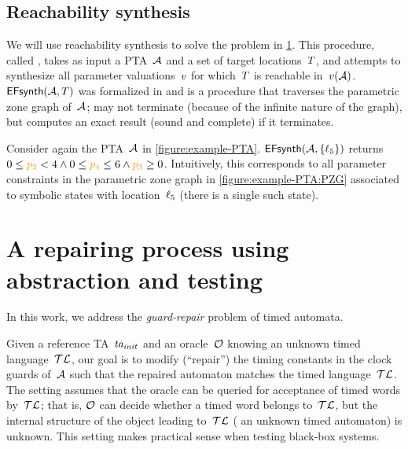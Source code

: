 \begin{tikzborder}{\cite{Gargantini16:validation}}
\begin{tikzborder}{\cite{gargantini_combinatorial_2017}}
\begin{tikzborder}{\cite{gargantini_combinatorial_2017}}
\begin{tikzborder}{\cite{garn2019}}
\begin{tikzborder}{\cite{arcaini2019achieving}}
\begin{tikzborder}{\cite{arcaini2019varivolution}}
\subsection{Reachability synthesis}

\begin{tikzborder}{}
We will use reachability synthesis to solve the problem in \ref{sec:proposedApproachSingle}.
This procedure, called \EFsynth{}, takes as input a PTA~$\mathcal{A}$ and a set of target locations~$T$, and attempts to synthesize all parameter valuations~$v$ for which~$T$ is reachable in~$v(\mathcal{A})$.
$\textsf{EFsynth}(\mathcal{A}, T)$ was formalized in \eg{} \cite{JLR15} and is a procedure that traverses the parametric zone graph of~$\mathcal{A}$;
\EFsynth{} may not terminate (because of the infinite nature of the graph), but computes an exact result (sound and complete) if it terminates.


\begin{example}
	Consider again the PTA~$\mathcal{A}$ in \ref{figure:example-PTA}.
	$\textsf{EFsynth}(\mathcal{A}, \{ \ell_5 \})$ returns $0 \leq \parami{2} < 4 \land 0 \leq \parami{4} \leq 6 \land \parami{3} \geq 0$.
	Intuitively, this corresponds to all parameter constraints in the parametric zone graph in \ref{figure:example-PTA:PZG} associated to symbolic states with location~$\ell_5$ (there is a single such state).
\end{example}
\end{tikzborder}

\section{A repairing process using abstraction and testing}\label{sec:proposedApproachSingle}

In this work, we address the \emph{guard-repair} problem of timed automata.

\bb
Given a reference TA~$\mathit{ta_{init}}$ and an oracle~$\mathcal{O}$ knowing an unknown timed language~$\mathcal{TL}$, our goal is to modify (``repair'') the timing constants in the clock guards of~$\mathcal{A}$ such that the repaired automaton matches the timed language~$\mathcal{TL}$.
%
The setting assumes that the oracle \oracleTa can be queried for acceptance of timed words by~$\mathcal{TL}$; that is, $\mathcal{O}$ can decide whether a timed word belongs to~$\mathcal{TL}$, but the internal structure of the object leading to~$\mathcal{TL}$ (\eg{} an unknown timed automaton) is unknown.
%
This setting makes practical sense when testing black-box systems.


\end{tikzborder}
\end{tikzborder}
\end{tikzborder}
\end{tikzborder}
\end{tikzborder}
\end{tikzborder}
